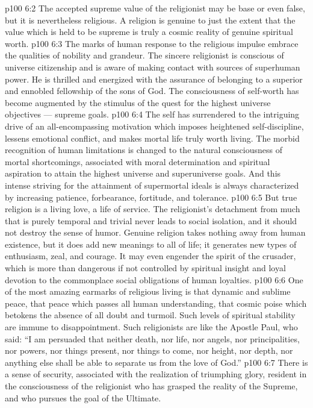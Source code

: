 \vs p100 6:2 The accepted supreme value of the religionist may be base or even false, but it is nevertheless religious. A religion is genuine to just the extent that the value which is held to be supreme is truly a cosmic reality of genuine spiritual worth.
\vs p100 6:3 The marks of human response to the religious impulse embrace the qualities of nobility and grandeur. The sincere religionist is conscious of universe citizenship and is aware of making contact with sources of superhuman power. He is thrilled and energized with the assurance of belonging to a superior and ennobled fellowship of the sons of God. The consciousness of self\hyp{}worth has become augmented by the stimulus of the quest for the highest universe objectives --- supreme goals.
\vs p100 6:4 The self has surrendered to the intriguing drive of an all\hyp{}encompassing motivation which imposes heightened self\hyp{}discipline, lessens emotional conflict, and makes mortal life truly worth living. The morbid recognition of human limitations is changed to the natural consciousness of mortal shortcomings, associated with moral determination and spiritual aspiration to attain the highest universe and superuniverse goals. And this intense striving for the attainment of supermortal ideals is always characterized by increasing patience, forbearance, fortitude, and tolerance.
\vs p100 6:5 But true religion is a living love, a life of service. The religionist’s detachment from much that is purely temporal and trivial never leads to social isolation, and it should not destroy the sense of humor. Genuine religion takes nothing away from human existence, but it does add new meanings to all of life; it generates new types of enthusiasm, zeal, and courage. It may even engender the spirit of the crusader, which is more than dangerous if not controlled by spiritual insight and loyal devotion to the commonplace social obligations of human loyalties.
\vs p100 6:6 \pc One of the most amazing earmarks of religious living is that dynamic and sublime peace, that peace which passes all human understanding, that cosmic poise which betokens the absence of all doubt and turmoil. Such levels of spiritual stability are immune to disappointment. Such religionists are like the Apostle Paul, who said: “I am persuaded that neither death, nor life, nor angels, nor principalities, nor powers, nor things present, nor things to come, nor height, nor depth, nor anything else shall be able to separate us from the love of God.”
\vs p100 6:7 There is a sense of security, associated with the realization of triumphing glory, resident in the consciousness of the religionist who has grasped the reality of the Supreme, and who pursues the goal of the Ultimate.
